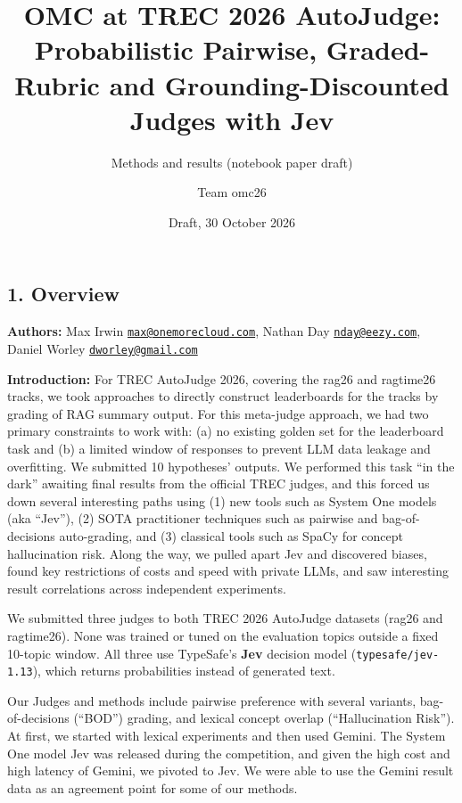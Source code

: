 \documentclass[
  10pt,
]{article}
\title{OMC at TREC 2026 AutoJudge: Probabilistic Pairwise, Graded-Rubric
and Grounding-Discounted Judges with Jev}
\subtitle{Methods and results (notebook paper draft)}
\author{Team omc26}
\date{Draft, 30 October 2026}
\newcommand{\passthrough}[1]{#1}
\begin{document}
\maketitle

\subsection{1. Overview}\label{overview}

\textbf{Authors:} Max Irwin
\href{mailto:max@onemorecloud.com}{\nolinkurl{max@onemorecloud.com}},
Nathan Day \href{mailto:nday@eezy.com}{\nolinkurl{nday@eezy.com}},
Daniel Worley
\href{mailto:dworley@gmail.com}{\nolinkurl{dworley@gmail.com}}

\textbf{Introduction:} For TREC AutoJudge 2026, covering the rag26 and
ragtime26 tracks, we took approaches to directly construct leaderboards
for the tracks by grading of RAG summary output. For this meta-judge
approach, we had two primary constraints to work with: (a) no existing
golden set for the leaderboard task and (b) a limited window of
responses to prevent LLM data leakage and overfitting. We submitted 10
hypotheses' outputs. We performed this task ``in the dark'' awaiting
final results from the official TREC judges, and this forced us down
several interesting paths using (1) new tools such as System One models
(aka ``Jev''), (2) SOTA practitioner techniques such as pairwise and
bag-of-decisions auto-grading, and (3) classical tools such as SpaCy for
concept hallucination risk. Along the way, we pulled apart Jev and
discovered biases, found key restrictions of costs and speed with
private LLMs, and saw interesting result correlations across independent
experiments.

We submitted three judges to both TREC 2026 AutoJudge datasets (rag26
and ragtime26). None was trained or tuned on the evaluation topics
outside a fixed 10-topic window. All three use TypeSafe's \textbf{Jev}
decision model (\passthrough{\lstinline!typesafe/jev-1.13!}), which
returns probabilities instead of generated text.

Our Judges and methods include pairwise preference with several
variants, bag-of-decisions (``BOD'') grading, and lexical concept
overlap (``Hallucination Risk''). At first, we started with lexical
experiments and then used Gemini. The System One model Jev was released
during the competition, and given the high cost and high latency of
Gemini, we pivoted to Jev. We were able to use the Gemini result data as
an agreement point for some of our methods.
\end{document}
